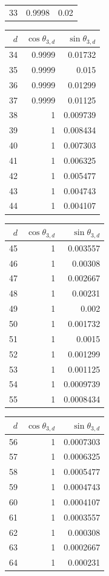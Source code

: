 {\begin{tabular}[t]{r|rr}
33 & 0.9998 & 0.02
\end{tabular}\kern4pt
\begin{tabular}[t]{r|rr}
$d$ & $\cos\theta_{3,d}$ & $\sin\theta_{3,d}$ \\\hline
34 & 0.9999 & 0.01732 \\
35 & 0.9999 & 0.015 \\
36 & 0.9999 & 0.01299 \\
37 & 0.9999 & 0.01125 \\
38 & 1 & 0.009739 \\
39 & 1 & 0.008434 \\
40 & 1 & 0.007303 \\
41 & 1 & 0.006325 \\
42 & 1 & 0.005477 \\
43 & 1 & 0.004743 \\
44 & 1 & 0.004107
\end{tabular}\kern4pt
\begin{tabular}[t]{r|rr}
$d$ & $\cos\theta_{3,d}$ & $\sin\theta_{3,d}$ \\\hline
45 & 1 & 0.003557 \\
46 & 1 & 0.00308 \\
47 & 1 & 0.002667 \\
48 & 1 & 0.00231 \\
49 & 1 & 0.002 \\
50 & 1 & 0.001732 \\
51 & 1 & 0.0015 \\
52 & 1 & 0.001299 \\
53 & 1 & 0.001125 \\
54 & 1 & 0.0009739 \\
55 & 1 & 0.0008434
\end{tabular}\kern4pt
\begin{tabular}[t]{r|rr}
$d$ & $\cos\theta_{3,d}$ & $\sin\theta_{3,d}$ \\\hline
56 & 1 & 0.0007303 \\
57 & 1 & 0.0006325 \\
58 & 1 & 0.0005477 \\
59 & 1 & 0.0004743 \\
60 & 1 & 0.0004107 \\
61 & 1 & 0.0003557 \\
62 & 1 & 0.000308 \\
63 & 1 & 0.0002667 \\
64 & 1 & 0.000231
\end{tabular}}

